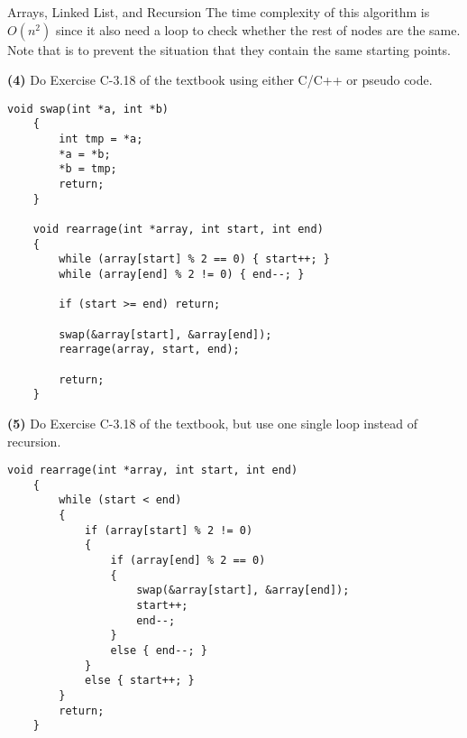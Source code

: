 \begin{homeworkProblem}{Arrays, Linked List, and Recursion}
    The time complexity of this algorithm is $O(n^2)$ since it also need a loop to check
    whether the rest of nodes are the same. Note that  is to prevent
    the situation that they contain the same starting points.
    \\

    \pagebreak

    \textbf{(4)} Do Exercise C-3.18 of the textbook using either C/C++ or pseudo code.

    \begin{lstlisting}[caption=Rearrange integer array by recursion.]
    void swap(int *a, int *b)
    {
        int tmp = *a;
        *a = *b;
        *b = tmp;
        return;
    }

    void rearrage(int *array, int start, int end)
    {
        while (array[start] % 2 == 0) { start++; }
        while (array[end] % 2 != 0) { end--; }

        if (start >= end) return;

        swap(&array[start], &array[end]);
        rearrage(array, start, end);

        return;
    }
    \end{lstlisting}

    \textbf{(5)} Do Exercise C-3.18 of the textbook, but use one single loop instead of 
    recursion.

    \begin{lstlisting}[caption=Rearrange integer array by one single loop]
    void rearrage(int *array, int start, int end)
    {
        while (start < end)
        {
            if (array[start] % 2 != 0)
            {
                if (array[end] % 2 == 0)
                {
                    swap(&array[start], &array[end]);
                    start++;
                    end--;
                }
                else { end--; }
            }
            else { start++; }
        }
        return;
    }
    \end{lstlisting}

\end{homeworkProblem}

\pagebreak

